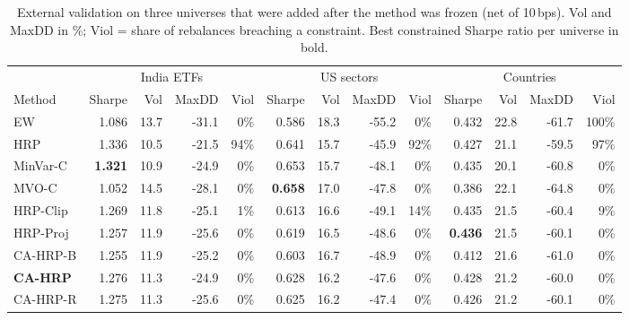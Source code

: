 \begin{table}[!htbp]\centering\small
\caption{External validation on three universes that were added after the method was frozen (net of 10\,bps). Vol and MaxDD in \%; Viol = share of rebalances breaching a constraint. Best constrained Sharpe ratio per universe in bold.}\label{tab:external}
\setlength{\tabcolsep}{4pt}\begin{tabular}{l rrrr rrrr rrrr}\toprule
 & \multicolumn{4}{c}{India ETFs} & \multicolumn{4}{c}{US sectors} & \multicolumn{4}{c}{Countries}\\
\cmidrule(lr){2-5}\cmidrule(lr){6-9}\cmidrule(lr){10-13}
Method & Sharpe & Vol & MaxDD & Viol & Sharpe & Vol & MaxDD & Viol & Sharpe & Vol & MaxDD & Viol\\\midrule
EW & 1.086 & 13.7 & -31.1 & 0\% & 0.586 & 18.3 & -55.2 & 0\% & 0.432 & 22.8 & -61.7 & 100\%\\
HRP & 1.336 & 10.5 & -21.5 & 94\% & 0.641 & 15.7 & -45.9 & 92\% & 0.427 & 21.1 & -59.5 & 97\%\\
\midrule
MinVar-C & \textbf{1.321} & 10.9 & -24.9 & 0\% & 0.653 & 15.7 & -48.1 & 0\% & 0.435 & 20.1 & -60.8 & 0\%\\
MVO-C & 1.052 & 14.5 & -28.1 & 0\% & \textbf{0.658} & 17.0 & -47.8 & 0\% & 0.386 & 22.1 & -64.8 & 0\%\\
HRP-Clip & 1.269 & 11.8 & -25.1 & 1\% & 0.613 & 16.6 & -49.1 & 14\% & 0.435 & 21.5 & -60.4 & 9\%\\
HRP-Proj & 1.257 & 11.9 & -25.6 & 0\% & 0.619 & 16.5 & -48.6 & 0\% & \textbf{0.436} & 21.5 & -60.1 & 0\%\\
CA-HRP-B & 1.255 & 11.9 & -25.2 & 0\% & 0.603 & 16.7 & -48.9 & 0\% & 0.412 & 21.6 & -61.0 & 0\%\\
\textbf{CA-HRP} & 1.276 & 11.3 & -24.9 & 0\% & 0.628 & 16.2 & -47.6 & 0\% & 0.428 & 21.2 & -60.0 & 0\%\\
CA-HRP-R & 1.275 & 11.3 & -25.6 & 0\% & 0.625 & 16.2 & -47.4 & 0\% & 0.426 & 21.2 & -60.1 & 0\%\\
\bottomrule\end{tabular}\end{table}